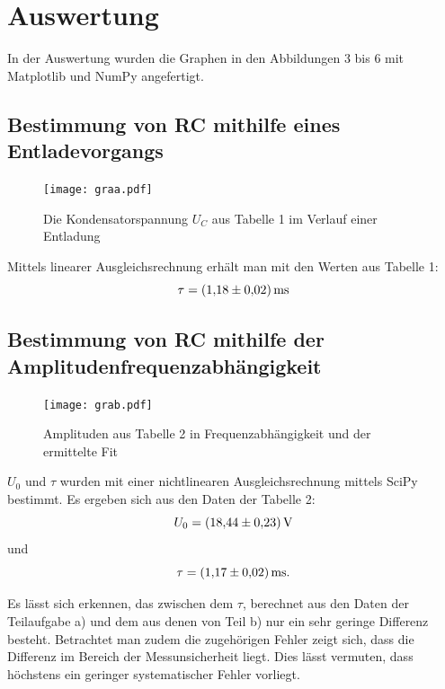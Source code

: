 \section{Auswertung}
\label{sec:Auswertung}
In der Auswertung wurden die Graphen in den Abbildungen 3 bis 6 mit Matplotlib \cite{matplotlib} und NumPy \cite{numpy} angefertigt.

\subsection{Bestimmung von RC mithilfe eines Entladevorgangs}
\begin{figure}[H]
	\centering
	\caption{Die Kondensatorspannung $U_C$ aus Tabelle 1 im Verlauf einer Entladung}
	\texttt{[image: graa.pdf]}
	\label{fig:graa}
\end{figure}


Mittels linearer Ausgleichsrechnung erhält man mit den Werten aus Tabelle 1:
\begin{displaymath}
\tau = \SI{1.18 \pm 0.02}{\milli\second}
\end{displaymath}
\subsection{Bestimmung von RC mithilfe der Amplitudenfrequenzabhängigkeit}
\begin{figure}[H]
	\centering
	\caption{Amplituden aus Tabelle 2 in Frequenzabhängigkeit und der ermittelte Fit}
	\texttt{[image: grab.pdf]}
	\label{fig:grab}
\end{figure}

$U_0$ und $\tau$ wurden mit einer nichtlinearen Ausgleichsrechnung mittels SciPy \cite{scipy} bestimmt. Es ergeben sich aus den Daten der Tabelle 2:
\begin{displaymath}
U_0 = \SI{18.44 \pm 0.23}{\volt}
\end{displaymath}
und
\begin{displaymath}
\tau = \SI{1.17 \pm 0.02}{\milli\second}\text{.}
\end{displaymath}

Es lässt sich erkennen, das zwischen dem $\tau$, berechnet aus den Daten der
 Teilaufgabe a) und dem aus denen von Teil b) nur ein sehr geringe Differenz
  besteht. Betrachtet man zudem die zugehörigen Fehler zeigt sich, dass die
	Differenz im Bereich der Messunsicherheit liegt. Dies lässt vermuten, dass höchstens ein geringer systematischer Fehler vorliegt.

